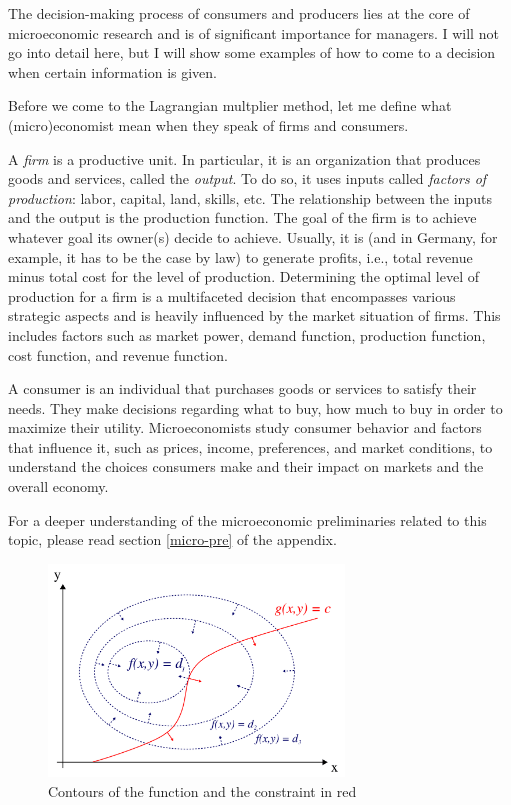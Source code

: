 \documentclass[
  12pt,
  oneside]{book}
\theoremstyle{definition}
\theoremstyle{definition}
\theoremstyle{definition}
\theoremstyle{definition}
\theoremstyle{remark}
\begin{document}
The decision-making process of consumers and producers lies at the core of microeconomic research and is of significant importance for managers. I will not go into detail here, but I will show some examples of how to come to a decision when certain information is given.

Before we come to the Lagrangian multplier method, let me define what (micro)economist mean when they speak of firms and consumers.

A \emph{firm} is a productive unit. In particular, it is an organization that produces goods and services, called the \emph{output}. To do so, it uses inputs called \emph{factors of production}: labor, capital, land, skills, etc. The relationship between the inputs and the output is the production function. The goal of the firm is to achieve whatever goal its owner(s) decide to achieve. Usually, it is (and in Germany, for example, it has to be the case by law) to generate profits, i.e., total revenue minus total cost for the level of production.
Determining the optimal level of production for a firm is a multifaceted decision that encompasses various strategic aspects and is heavily influenced by the market situation of firms. This includes factors such as market power, demand function, production function, cost function, and revenue function.

A consumer is an individual that purchases goods or services to satisfy their needs. They make decisions regarding what to buy, how much to buy in order to maximize their utility. Microeconomists study consumer behavior and factors that influence it, such as prices, income, preferences, and market conditions, to understand the choices consumers make and their impact on markets and the overall economy.

For a deeper understanding of the microeconomic preliminaries related to this topic, please read section \ref{micro-pre} of the appendix.

\begin{figure}
\centering
\includegraphics[width=0.7\textwidth,height=\textheight]{fig/lagr2.png}
\caption{\label{fig:lagr2} Contours of the function and the constraint in red}
\end{figure}
\end{document}

